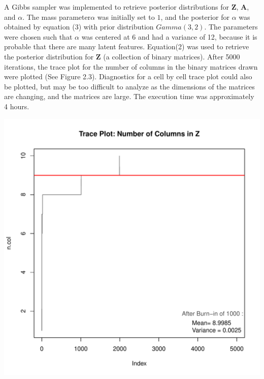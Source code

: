 \noindent
A Gibbs sampler was implemented to retrieve posterior distributions for $\bm
Z$, $\bm A$, and $\alpha$. The mass parameter$\alpha$ was initially set to $1$,
and the posterior for $\alpha$ was obtained by equation (3) with prior
distribution $Gamma(3,2)$.  The parameters were chosen such that $\alpha$ was
centered at 6 and had a variance of 12, because it is probable that there are
many latent features.  Equation(2) was used to retrieve the posterior
distribution for $\bm Z$ (a collection of binary matrices). After 5000
iterations, the trace plot for the number of columns in the binary matrices
drawn were plotted (See Figure 2.3). Diagnostics for a cell by cell trace plot
could also be plotted, but may be too difficult to analyze as the dimensions of
the matrices are changing, and the matrices are large. The execution time was
approximately 4 hours.
\beginmyfig
  \caption{}
  \includegraphics{images/traceplot.pdf}
  \vspace{-15mm}
\endmyfig
\beginmyfig
  \caption{}
